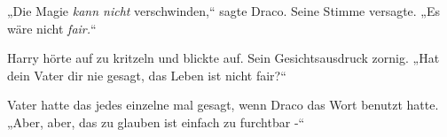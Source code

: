 „Die Magie \emph{kann nicht} verschwinden,“ sagte Draco. Seine Stimme versagte. „Es wäre nicht \emph{fair.}“

Harry hörte auf zu kritzeln und blickte auf. Sein Gesichtsausdruck zornig. „Hat dein Vater dir nie gesagt, das Leben ist nicht fair?“

Vater hatte das jedes einzelne mal gesagt, wenn Draco das Wort benutzt hatte. „Aber, aber, das zu glauben ist einfach zu furchtbar -“

